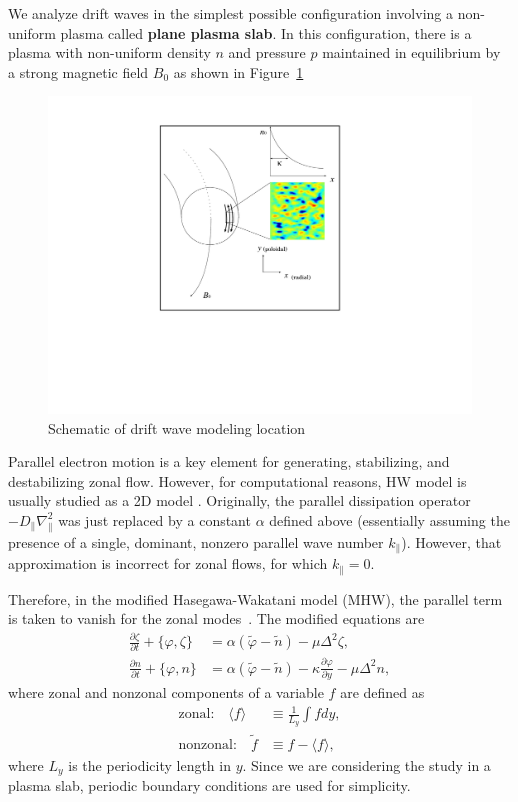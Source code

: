 \documentclass[12pt,lot, lof]{puthesis}
\begin{document}
We analyze drift waves in the simplest possible configuration involving a non-uniform plasma called \textbf{plane plasma slab}. In this configuration, there is a plasma with non-uniform density $n$ and pressure $p$ maintained in equilibrium by a strong magnetic field $B_0$ as shown in Figure~\ref{waka1}

\begin{figure}[htbp]
\centering
\includegraphics[width= 0.6\linewidth]{waka1}
\caption{Schematic of drift wave modeling location }
\label{waka1}
\end{figure}

Parallel electron motion is a key element for generating, stabilizing, and destabilizing zonal flow. However, for computational reasons, HW model is usually studied as a 2D model \cite{Smolyakov, Numata}. Originally, the parallel dissipation operator $-D_\parallel \nabla_\parallel^2$ was just replaced by a constant $\alpha$ defined above (essentially assuming the presence of a single, dominant, nonzero parallel wave number $k_\parallel$).  However, that approximation is incorrect for zonal flows, for which $k_\parallel = 0$.  

Therefore, in the modified Hasegawa-Wakatani model (MHW), the parallel term is taken to vanish for the zonal modes~\cite{Smolyakov}. The modified equations are
\begin{subequations}
\label{MHW1a}
\begin{align}
	\frac{\partial \zeta}{\partial t}  + \{\varphi , \zeta \} &= \alpha (\tilde{\varphi}-\tilde{n}) - \mu \Delta^2 \zeta \label{MHW1aa}	, \\	
	\frac{\partial n}{\partial t}  + \{\varphi , n\} &=  \alpha (\tilde{\varphi}-\tilde{n}) -\kappa \frac{\partial \varphi}{\partial y}- \mu \Delta^2 n,
\label{MHW1bb}	
\end{align}
\end{subequations}
%
where zonal and nonzonal components of a variable $f$ are defined as
\begin{subequations}
\begin{align}
\mbox{zonal:} \quad  \langle f  \rangle &\equiv \frac{1}{L_y} \int fdy, \\
 \mbox{nonzonal:} \quad   \tilde{f}  &\equiv f - \langle f  \rangle,
\end{align}
\end{subequations}
where $L_y$ is the periodicity length in $y$. Since we are considering the study in a plasma slab, periodic boundary conditions are used for simplicity.
\end{document}
